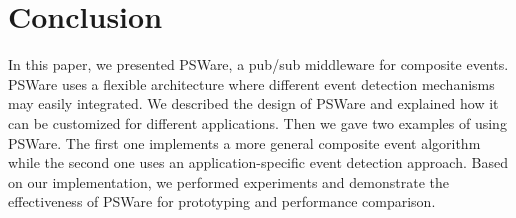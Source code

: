 \section{Conclusion}
\label{sec:conclusion}
In this paper, we presented PSWare, a pub/sub middleware for composite events. PSWare uses a flexible architecture where different event detection mechanisms may easily integrated. We described the design of PSWare and explained how it can be customized for different applications. Then we gave two examples of using PSWare. The first one implements a more general composite event algorithm while the second one uses an application-specific event detection approach. Based on our implementation, we performed experiments and demonstrate the effectiveness of PSWare for prototyping and performance comparison.